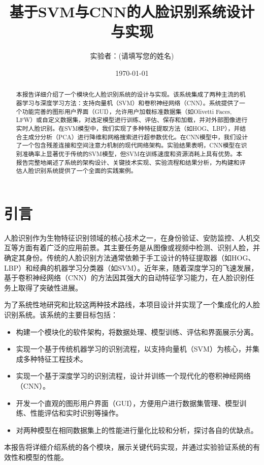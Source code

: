 \documentclass[a4paper]{article}
\title{\bfseries 基于SVM与CNN的人脸识别系统设计与实现}
\author{实验者：(请填写您的姓名)}
\date{\today}
\begin{document}
\maketitle
\thispagestyle{empty}
\newpage

\tableofcontents
\newpage

\begin{abstract}
\noindent 本报告详细介绍了一个模块化人脸识别系统的设计与实现。该系统集成了两种主流的机器学习与深度学习方法：支持向量机（SVM）和卷积神经网络（CNN）。系统提供了一个功能完善的图形用户界面（GUI），允许用户加载标准数据集（如Olivetti Faces, LFW）或自定义数据集，对选定模型进行训练、评估、保存和加载，并对外部图像进行实时人脸识别。在SVM模型中，我们实现了多种特征提取方法（如HOG、LBP），并结合主成分分析（PCA）进行降维和网格搜索进行超参数优化。在CNN模型中，我们设计了一个包含残差连接和空间注意力机制的现代网络架构。实验结果表明，CNN模型在识别准确率上显著优于传统的SVM模型，但SVM在训练速度和资源消耗上具有优势。本报告完整地阐述了系统的架构设计、关键技术实现、实验流程和结果分析，为构建和评估人脸识别系统提供了一个全面的实践案例。
\end{abstract}

\section{引言}
人脸识别作为生物特征识别领域的核心技术之一，在身份验证、安防监控、人机交互等方面有着广泛的应用前景。其主要任务是从图像或视频中检测、识别人脸，并确定其身份。传统的人脸识别方法通常依赖于手工设计的特征提取器（如HOG、LBP）和经典的机器学习分类器（如SVM）。近年来，随着深度学习的飞速发展，基于卷积神经网络（CNN）的方法因其强大的自动特征学习能力，在人脸识别任务上取得了突破性进展。

为了系统性地研究和比较这两种技术路线，本项目设计并实现了一个集成化的人脸识别系统。该系统的主要目标包括：
\begin{itemize}
    \item 构建一个模块化的软件架构，将数据处理、模型训练、评估和界面展示分离。
    \item 实现一个基于传统机器学习的识别流程，以支持向量机（SVM）为核心，并集成多种特征工程技术。
    \item 实现一个基于深度学习的识别流程，设计并训练一个现代化的卷积神经网络（CNN）。
    \item 开发一个直观的图形用户界面（GUI），方便用户进行数据集管理、模型训练、性能评估和实时识别等操作。
    \item 对两种模型在相同数据集上的性能进行量化比较和分析，探讨各自的优缺点。
\end{itemize}
本报告将详细介绍系统的各个模块，展示关键代码实现，并通过实验验证系统的有效性和模型的性能。
\end{document}
